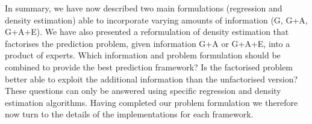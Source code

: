 In summary, we have now described two main formulations (regression and density estimation) able to incorporate varying amounts of information (G, G+A, G+A+E). We have also presented a reformulation of density estimation that factorises the prediction problem, given information G+A or G+A+E, into a product of experts. Which information and problem formulation should be combined to provide the best prediction framework?
Is the factorised problem better able to exploit the additional
information than the unfactorised version? These questions can only be
answered using specific regression and density estimation
algorithms. Having completed our problem formulation we therefore now
turn to the details of the implementations for each framework.
